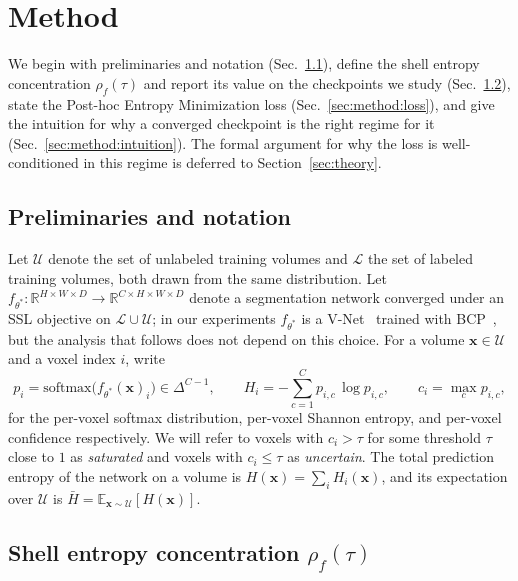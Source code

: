 \section{Method}
\label{sec:method}

We begin with preliminaries and notation (Sec.~\ref{sec:method:prelim}), define the shell entropy concentration $\rho_f(\tau)$ and report its value on the checkpoints we study (Sec.~\ref{sec:method:rho}), state the Post-hoc Entropy Minimization loss (Sec.~\ref{sec:method:loss}), and give the intuition for why a converged checkpoint is the right regime for it (Sec.~\ref{sec:method:intuition}). The formal argument for why the loss is well-conditioned in this regime is deferred to Section~\ref{sec:theory}.

\subsection{Preliminaries and notation}
\label{sec:method:prelim}

Let $\mathcal{U}$ denote the set of unlabeled training volumes and $\mathcal{L}$ the set of labeled training volumes, both drawn from the same distribution. Let $f_{\theta^*}: \mathbb{R}^{H\times W\times D} \to \mathbb{R}^{C \times H \times W \times D}$ denote a segmentation network converged under an SSL objective on $\mathcal{L} \cup \mathcal{U}$; in our experiments $f_{\theta^*}$ is a V-Net~\cite{milletari2016vnet} trained with BCP~\cite{bai2023bcp}, but the analysis that follows does not depend on this choice. For a volume $\mathbf{x} \in \mathcal{U}$ and a voxel index $i$, write
\begin{equation}
p_i = \mathrm{softmax}\big(f_{\theta^*}(\mathbf{x})_i\big) \in \Delta^{C-1},
\qquad
H_i = -\sum_{c=1}^{C} p_{i,c}\,\log p_{i,c},
\qquad
c_i = \max_{c} p_{i,c},
\end{equation}
for the per-voxel softmax distribution, per-voxel Shannon entropy, and per-voxel confidence respectively. We will refer to voxels with $c_i\!>\!\tau$ for some threshold $\tau$ close to $1$ as \emph{saturated} and voxels with $c_i\!\le\!\tau$ as \emph{uncertain}. The total prediction entropy of the network on a volume is $H(\mathbf{x}) = \sum_i H_i(\mathbf{x})$, and its expectation over $\mathcal{U}$ is $\bar H = \mathbb{E}_{\mathbf{x}\sim\mathcal{U}}[H(\mathbf{x})]$.

\subsection{Shell entropy concentration $\rho_f(\tau)$}
\label{sec:method:rho}

